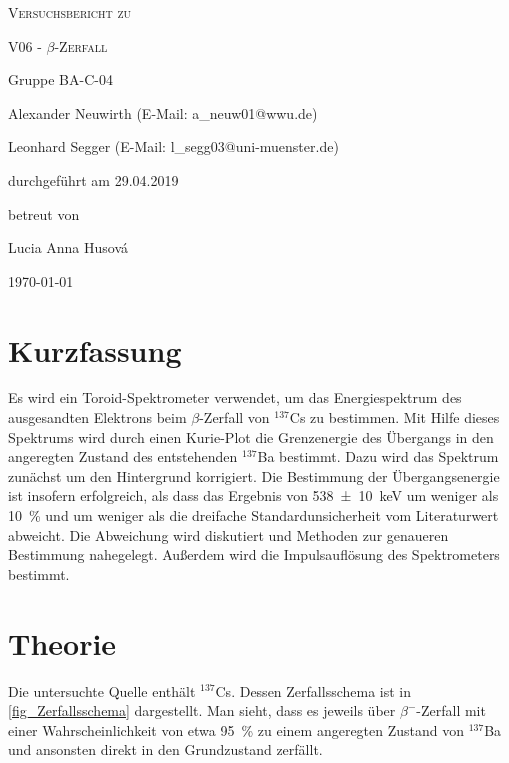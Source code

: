 \documentclass[
	a4paper,
	12pt,
	pagesize,
	ngerman
]{scrartcl}
\begin{document}
	\begin{titlepage}
		\centering
		{\scshape\LARGE Versuchsbericht zu \par}
		\vspace{1cm}
		{\scshape\huge V06 - $\beta$-Zerfall \par}
		\vspace{2.5cm}
		{\LARGE Gruppe BA-C-04 \par}
		\vspace{0.5cm}

		{\large Alexander Neuwirth (E-Mail: a\_neuw01@wwu.de) \par}
		{\large Leonhard Segger (E-Mail: l\_segg03@uni-muenster.de) \par}
		\vfill

		durchgeführt am 29.04.2019\par
		betreut von\par
		{\large Lucia Anna Husová}

		\vfill

		{\large \today\par}
	\end{titlepage}
	\tableofcontents
	\newpage


	\section{Kurzfassung}
	Es wird ein Toroid-Spektrometer verwendet, um das Energiespektrum des ausgesandten Elektrons beim $\beta$-Zerfall von $^{137}$Cs zu bestimmen.
	Mit Hilfe dieses Spektrums wird durch einen Kurie-Plot die Grenzenergie des Übergangs in den angeregten Zustand des entstehenden $^{137}$Ba bestimmt.
	Dazu wird das Spektrum zunächst um den Hintergrund korrigiert.
	Die Bestimmung der Übergangsenergie ist insofern erfolgreich, als dass das Ergebnis von \SI{538 \pm 10}{keV} um weniger als \SI{10}{\percent} und um weniger als die dreifache Standardunsicherheit vom Literaturwert abweicht.
	Die Abweichung wird diskutiert und Methoden zur genaueren Bestimmung nahegelegt.
	Außerdem wird die Impulsauflösung des Spektrometers bestimmt.

  \section{Theorie}
	Die untersuchte Quelle enthält $^{137}$Cs.
	Dessen Zerfallsschema ist in \cref{fig_Zerfallsschema} dargestellt.
	Man sieht, dass es jeweils über $\beta^-$-Zerfall mit einer Wahrscheinlichkeit von etwa \SI{95}{\percent} zu einem angeregten Zustand von $^{137}$Ba und ansonsten direkt in den Grundzustand zerfällt.
\end{document}
